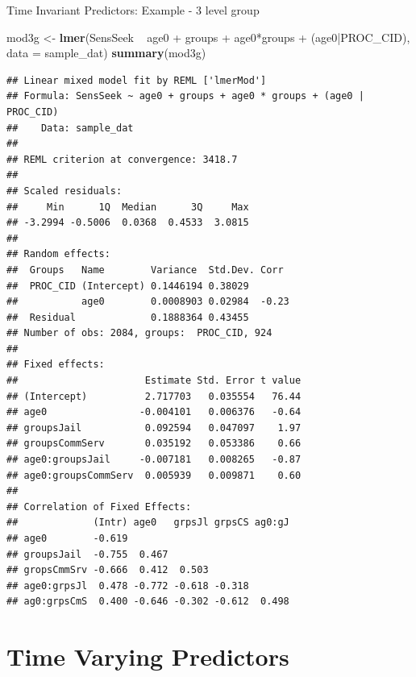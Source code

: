 \documentclass[ignorenonframetext,]{beamer}
\newenvironment{Shaded}{\begin{snugshade}}{\end{snugshade}}
\newcommand{\KeywordTok}[1]{\textcolor[rgb]{0.13,0.29,0.53}{\textbf{{#1}}}}
\newcommand{\DataTypeTok}[1]{\textcolor[rgb]{0.13,0.29,0.53}{{#1}}}
\newcommand{\StringTok}[1]{\textcolor[rgb]{0.31,0.60,0.02}{{#1}}}
\newcommand{\NormalTok}[1]{{#1}}
\begin{document}
\begin{frame}[fragile]{Time Invariant Predictors: Example - 3 level
group}

\small

\begin{Shaded}
\begin{Highlighting}[]
\NormalTok{mod3g <-}\StringTok{ }\KeywordTok{lmer}\NormalTok{(SensSeek ~}\StringTok{ }\NormalTok{age0 +}\StringTok{ }\NormalTok{groups +}\StringTok{ }\NormalTok{age0*groups +}\StringTok{ }
\StringTok{                }\NormalTok{(age0|PROC_CID), }\DataTypeTok{data =} \NormalTok{sample_dat)}
\KeywordTok{summary}\NormalTok{(mod3g)}
\end{Highlighting}
\end{Shaded}

\tiny

\begin{verbatim}
## Linear mixed model fit by REML ['lmerMod']
## Formula: SensSeek ~ age0 + groups + age0 * groups + (age0 | PROC_CID)
##    Data: sample_dat
## 
## REML criterion at convergence: 3418.7
## 
## Scaled residuals: 
##     Min      1Q  Median      3Q     Max 
## -3.2994 -0.5006  0.0368  0.4533  3.0815 
## 
## Random effects:
##  Groups   Name        Variance  Std.Dev. Corr 
##  PROC_CID (Intercept) 0.1446194 0.38029       
##           age0        0.0008903 0.02984  -0.23
##  Residual             0.1888364 0.43455       
## Number of obs: 2084, groups:  PROC_CID, 924
## 
## Fixed effects:
##                      Estimate Std. Error t value
## (Intercept)          2.717703   0.035554   76.44
## age0                -0.004101   0.006376   -0.64
## groupsJail           0.092594   0.047097    1.97
## groupsCommServ       0.035192   0.053386    0.66
## age0:groupsJail     -0.007181   0.008265   -0.87
## age0:groupsCommServ  0.005939   0.009871    0.60
## 
## Correlation of Fixed Effects:
##             (Intr) age0   grpsJl grpsCS ag0:gJ
## age0        -0.619                            
## groupsJail  -0.755  0.467                     
## gropsCmmSrv -0.666  0.412  0.503              
## age0:grpsJl  0.478 -0.772 -0.618 -0.318       
## ag0:grpsCmS  0.400 -0.646 -0.302 -0.612  0.498
\end{verbatim}

\normalsize

\end{frame}

\section{Time Varying Predictors}\label{time-varying-predictors}
\end{document}
